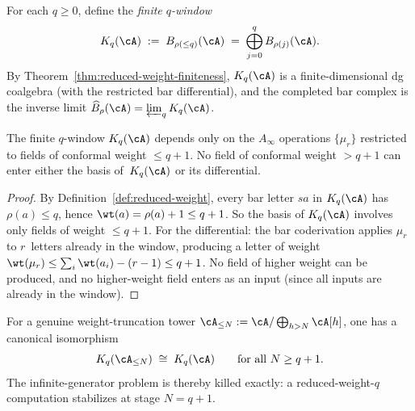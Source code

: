 \begin{definition}
\label{def:finite-window}%
%
%
For each $q \geq 0$, define the \emph{finite $q$-window}
\begin{equation}\label{eq:nms-finite-window}
K_q(\cA)
\;:=\;
B_{\rho(\leq q)}(\cA)
\;=\;
\bigoplus_{j=0}^q B_{\rho(j)}(\cA).
\end{equation}
By Theorem~\ref{thm:reduced-weight-finiteness}, $K_q(\cA)$ is a
finite-dimensional dg coalgebra (with the restricted bar
differential), and the completed bar complex is the inverse limit
$\widehat{B}_\rho(\cA) = \varprojlim_q K_q(\cA)$.
\end{definition}

\begin{theorem}
\label{thm:window-locality}%
%
%
The finite $q$-window $K_q(\cA)$ depends only on the
$A_\infty$ operations $\{\mu_r\}$ restricted to fields of conformal
weight $\leq q + 1$. No field of conformal weight $> q + 1$ can
enter either the basis of~$K_q(\cA)$ or its differential.
\end{theorem}

\begin{proof}
By Definition~\ref{def:reduced-weight}, every bar letter $sa$ in
$K_q(\cA)$ has $\rho(a) \leq q$, hence
$\wt(a) = \rho(a) + 1 \leq q + 1$. So the basis of $K_q(\cA)$
involves only fields of weight $\leq q + 1$. For the differential:
the bar coderivation applies $\mu_r$ to $r$~letters already in the
window, producing a letter of weight
$\wt(\mu_r) \leq \sum_i \wt(a_i) - (r - 1) \leq q + 1$. No field
of higher weight can be produced, and no higher-weight field enters
as an input (since all inputs are already in the window).
\end{proof}

\begin{corollary}
\label{cor:exact-stabilization}%
%
%
For a genuine weight-truncation tower
$\cA_{\leq N} := \cA / \bigoplus_{h > N} \cA[h]$, one has a
canonical isomorphism
\begin{equation}\label{eq:nms-exact-stabilization}
K_q(\cA_{\leq N})
\;\cong\;
K_q(\cA)
\qquad
\text{for all } N \geq q + 1.
\end{equation}
The infinite-generator problem is thereby killed exactly: a
reduced-weight-$q$ computation stabilizes at stage $N = q + 1$.
\end{corollary}

